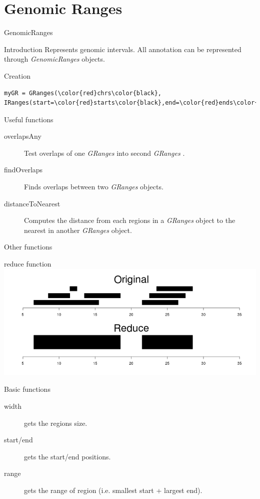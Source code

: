 \documentclass[10pt]{beamer}
\newcommand{\gr}{{\it GRanges} }
\begin{document}
\section{Genomic Ranges}

\begin{frame}[fragile]{GenomicRanges}
  \begin{block}{Introduction}
    Represents genomic intervals. All annotation can be represented through {\it GenomicRanges} objects.
  \end{block}
  \begin{block}{Creation}
\begin{Verbatim}[commandchars=\\\{\}]
myGR = GRanges(\color{red}chrs\color{black}, IRanges(start=\color{red}starts\color{black},end=\color{red}ends\color{black}))
\end{Verbatim}      
  \end{block}
  \begin{block}{Useful functions}
    \begin{description}
    \item[overlapsAny] Test overlaps of one \gr into second \gr.
    \item[findOverlaps] Finds overlaps between two {\it GRanges} objects.
    \item[distanceToNearest] Computes the distance from each regions in a {\it GRanges} object to the nearest in another {\it GRanges} object.
    \end{description}
  \end{block}
\end{frame}

\begin{frame}{Other functions}
  \begin{block}{{\sf reduce} function}
    \centering
    \includegraphics[width=.9\textwidth]{../imgs/reduce.png}
  \end{block}
  \begin{block}{Basic functions}
    \begin{description}
    \item[width] gets the regions size.
    \item[start/end] gets the start/end positions.
    \item[range] gets the range of region (i.e. smallest start + largest end).
    \end{description}
  \end{block}

\end{frame}
\end{document}
